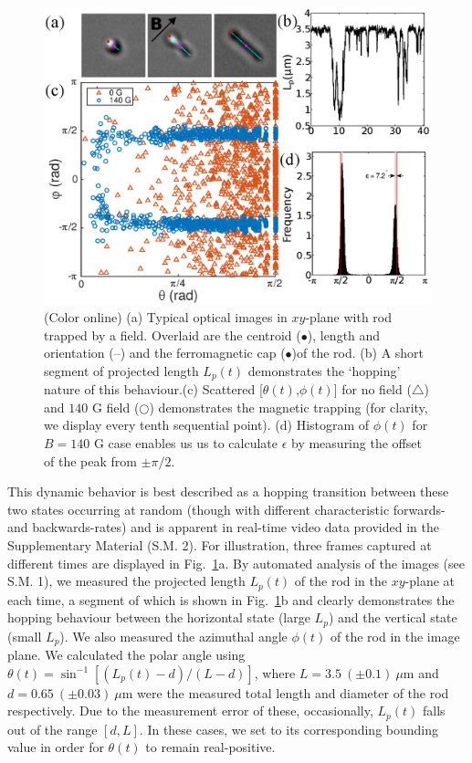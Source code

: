 \documentclass[aps,prl,reprint,twocolumn,superscriptaddress,showpacs]{revtex4-1}
\begin{document}
\begin{figure}[t]
\centering
\includegraphics[width=\columnwidth]{figs/Fig2updated.eps}
\caption{\footnotesize \label{fig2} (Color online) (a) Typical optical images in $xy$-plane with rod trapped by a field. Overlaid are the centroid ({\color{magenta}$\bullet$}), length and orientation ({\color{cyan}--}) and the ferromagnetic cap ({\color{red}$\bullet$})of the rod. (b) A short segment of projected length $L_p(t)$ demonstrates the `hopping' nature of this behaviour.(c) Scattered [$\theta(t)$,$\phi(t)$] for no field ({\color{red}$\bigtriangleup$}) and $140$ G field ({\color{NavyBlue}$\bigcirc$}) demonstrates the magnetic trapping (for clarity, we display every tenth sequential point). (d) Histogram of $\phi(t)$ for $B=140$ G case enables us us to calculate $\epsilon$ by measuring the offset of the peak from $\pm \pi/2$.}
\end{figure}

This dynamic behavior is best described as a hopping transition between these two states occurring at random (though with different characteristic forwards- and backwards-rates) and is apparent in real-time video data provided in the Supplementary Material (S.M. 2). For illustration, three frames captured at different times are displayed in Fig.\ \ref{fig2}a. By automated analysis of the images (see S.M. 1), we measured the projected length $L_p(t)$ of the rod in the $xy$-plane at each time, a segment of which is shown in Fig.\ \ref{fig2}b and clearly demonstrates the hopping behaviour between the horizontal state (large $L_p$) and the vertical state (small $L_p$). We also measured the azimuthal angle $\phi(t)$ of the rod in the image plane. We calculated the polar angle using $\theta(t) = \sin^{-1}{[(L_p(t)- d)/(L - d)]}$, where $L=3.5\ (\pm0.1)\ \mu$m and $d=0.65\ (\pm0.03)\ \mu$m were the measured total length and diameter of the rod respectively. Due to the measurement error of these, occasionally, $L_p(t)$ falls out of the range $[d, L]$. In these cases, we set to its corresponding bounding value in order for $\theta(t)$ to remain real-positive.
\end{document}

